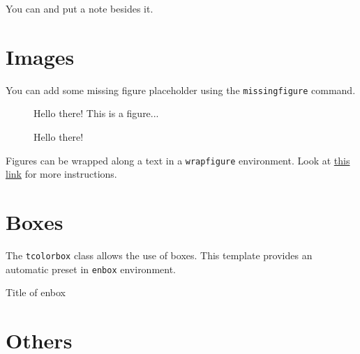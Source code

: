 \lipsum[12]
\lipsum[13]

You can 
 and put a note besides it.
\lipsum[14]




\section{Images}

You can add some missing figure placeholder using the \texttt{missingfigure} command.


\lipsum[20]

\begin{figure}
\caption{Hello there! This is a figure...}
\end{figure}

\lipsum[21]



\begin{wrapfigure}{r}{0.5\textwidth}
\caption{Hello there!}
\end{wrapfigure}
Figures can be wrapped along a text in a \texttt{wrapfigure} environment. Look at \href{https://it.overleaf.com/learn/latex/Wrapping_text_around_figures}{this link} for more instructions.
\lipsum[31]

\lipsum[32-33]



\section{Boxes}

The \texttt{tcolorbox} class allows the use of boxes. This template provides an automatic preset in \texttt{enbox} environment.

\begin{enbox}{Title of enbox}
\lipsum[30]
\end{enbox}




\section{Others}

